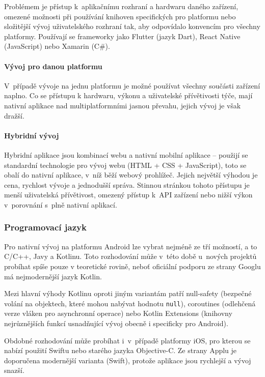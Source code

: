 \documentclass[twoside]{ctuthesis}
\begin{document}
Problémem je přístup k~aplikačnímu rozhraní a hardwaru daného zařízení, omezené možnosti při používání knihoven specifických pro platformu nebo složitější vývoj uživatelského rozhraní tak, aby odpovídalo konvencím pro všechny platformy. \cite{manchanda2020where}   Používají se frameworky jako Flutter (jazyk Dart), React Native (JavaScript) nebo Xamarin (C\#).

\paragraph{Vývoj pro danou platformu}
V~případě vývoje na jednu platformu je možné používat všechny součásti zařízení naplno. Co se přístupu k hardwaru, výkonu a uživatelské přívětivosti týče, mají nativní aplikace nad multiplatformními jasnou převahu, jejich vývoj je však dražší. \cite{dennis2018native}

\paragraph{Hybridní vývoj}
Hybridní aplikace jsou kombinací webu a nativní mobilní aplikace – použijí se standardní technologie pro vývoj webu (HTML + CSS + JavaScript), toto se obalí do nativní aplikace, v~níž běží webový prohlížeč. Jejich největší výhodou je cena, rychlost vývoje a jednodušší správa. Stinnou stránkou tohoto přístupu je menší uživatelská přívětivost, omezený přístup k~API zařízení nebo nižší výkon v~porovnání s~plně nativní aplikací. \cite{design2020ultimate}


\subsubsection{Programovací jazyk}
Pro nativní vývoj na platformu Android lze vybrat nejméně ze tří možností, a to C/C++, Javy a Kotlinu. Toto rozhodování může v~této době u~nových projektů probíhat spíše pouze v teoretické rovině, neboť oficiální podporu ze strany Googlu má nejmodernější jazyk Kotlin.

Mezi hlavní výhody Kotlinu oproti jiným variantám patří null-safety (bezpečné volání na objektech, které mohou nabývat hodnotu \texttt{null}), coroutines (odlehčená verze vláken pro asynchronní operace) nebo Kotlin Extensions (knihovny nejrůznějších funkcí usnadňující vývoj obecně i specificky pro Android). \cite{android2021kotlin}

Obdobné rozhodování může probíhat i~v~případě platformy iOS, pro kterou se nabízí použití Swiftu nebo starého jazyka Objective-C. Ze strany Applu je doporučena modernější varianta (Swift), protože aplikace jsou rychlejší a vývoj snazší.
\end{document}
